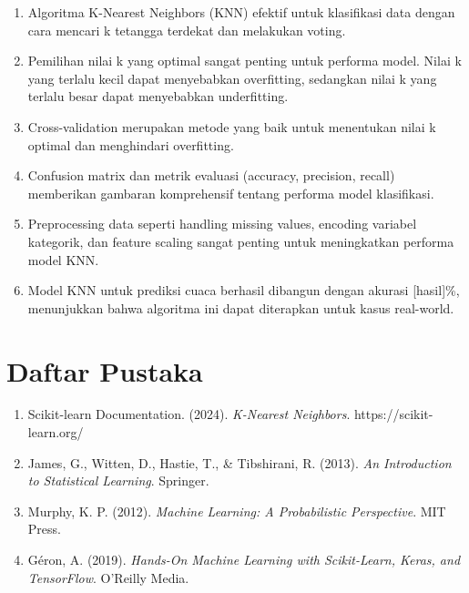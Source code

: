 \documentclass[12pt,a4paper]{article}
\begin{document}
\begin{enumerate}
    \item Algoritma K-Nearest Neighbors (KNN) efektif untuk klasifikasi data dengan cara mencari k tetangga terdekat dan melakukan voting.
    
    \item Pemilihan nilai k yang optimal sangat penting untuk performa model. Nilai k yang terlalu kecil dapat menyebabkan overfitting, sedangkan nilai k yang terlalu besar dapat menyebabkan underfitting.
    
    \item Cross-validation merupakan metode yang baik untuk menentukan nilai k optimal dan menghindari overfitting.
    
    \item Confusion matrix dan metrik evaluasi (accuracy, precision, recall) memberikan gambaran komprehensif tentang performa model klasifikasi.
    
    \item Preprocessing data seperti handling missing values, encoding variabel kategorik, dan feature scaling sangat penting untuk meningkatkan performa model KNN.
    
    \item Model KNN untuk prediksi cuaca berhasil dibangun dengan akurasi [hasil]\%, menunjukkan bahwa algoritma ini dapat diterapkan untuk kasus real-world.
\end{enumerate}

\section{Daftar Pustaka}

\begin{enumerate}
    \item Scikit-learn Documentation. (2024). \textit{K-Nearest Neighbors}. https://scikit-learn.org/
    
    \item James, G., Witten, D., Hastie, T., \& Tibshirani, R. (2013). \textit{An Introduction to Statistical Learning}. Springer.
    
    \item Murphy, K. P. (2012). \textit{Machine Learning: A Probabilistic Perspective}. MIT Press.
    
    \item Géron, A. (2019). \textit{Hands-On Machine Learning with Scikit-Learn, Keras, and TensorFlow}. O'Reilly Media.
\end{enumerate}
\end{document}
